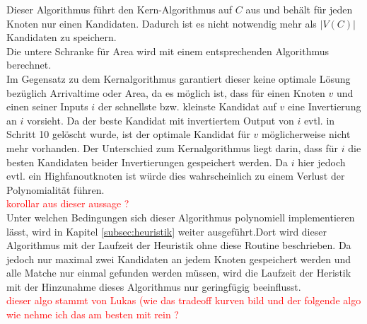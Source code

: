 \documentclass[11pt, a4paper, german]{article}
\begin{document}
 Dieser Algorithmus führt den Kern-Algorithmus  auf $C$ aus und behält für jeden Knoten nur einen Kandidaten. Dadurch ist es nicht notwendig mehr als $|V(C)|$ Kandidaten zu speichern. \\
 Die untere Schranke für Area wird mit einem entsprechenden Algorithmus berechnet. \\
Im Gegensatz zu dem Kernalgorithmus garantiert dieser keine optimale Lösung bezüglich Arrivaltime oder Area, da es möglich ist, dass für einen Knoten $v$ und einen seiner Inputs $i$ der schnellste bzw. kleinste Kandidat auf $v$ eine Invertierung an $i$ vorsieht. Da der beste Kandidat mit invertiertem Output von $i$ evtl. in Schritt 10 gelöscht wurde, ist der optimale Kandidat für $v$ möglicherweise nicht mehr vorhanden. Der Unterschied zum Kernalgorithmus liegt darin, dass für $i$ die besten Kandidaten beider Invertierungen gespeichert werden. Da $i$ hier jedoch evtl. ein Highfanoutknoten ist würde dies wahrscheinlich zu einem Verlust der Polynomialität führen.\\
\textcolor{red}{korollar aus dieser aussage ? }\\

Unter welchen Bedingungen sich dieser Algorithmus polynomiell implementieren lässt, wird in Kapitel \ref{subsec:heuristik} weiter ausgeführt.Dort wird dieser Algorithmus mit der Laufzeit der Heuristik ohne diese Routine beschrieben. Da jedoch nur maximal zwei Kandidaten an jedem Knoten gespeichert werden und alle Matche nur einmal gefunden werden müssen, wird die Laufzeit der Heristik mit der Hinzunahme dieses Algorithmus nur geringfügig beeinflusst.\\

 \textcolor{red}{dieser algo stammt von Lukas (wie das tradeoff kurven bild und der folgende algo wie nehme ich das am besten mit rein ?}\\
\end{document}
